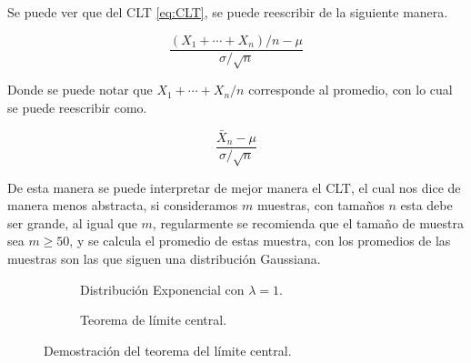 Se puede ver que del CLT \ref{eq:CLT}, se puede reescribir de la siguiente manera.

\begin{equation*}
	\frac{(X_1+\cdots+X_n)/n - \mu}{\sigma / \sqrt{n}}
\end{equation*}

Donde se puede notar que $X_1+\cdots + X_n/n$ corresponde al promedio, con lo cual se puede reescribir como.

\begin{equation*}
	\frac{\bar{X}_n - \mu}{\sigma / \sqrt{n}}
\end{equation*}

De esta manera se puede interpretar de mejor manera el CLT, el cual nos dice de manera menos abstracta, si consideramos $m$ muestras, con tamaños $n$ esta debe ser grande, al igual que $m$,  regularmente se recomienda que el tamaño de muestra sea $m\geq 50$, y se calcula el promedio de estas muestra, con los promedios de las muestras son las que siguen una distribución Gaussiana.

\begin{figure}[!ht]
    \centering %
    \begin{subfigure}{0.45\textwidth} %
        \centering
        \resizebox{\linewidth}{!}{} %
        \caption{Distribución Exponencial con $\lambda=1$.}
        \label{fig:DisExpo}
    \end{subfigure}
    \hfill
    \begin{subfigure}{0.45\textwidth}
        \centering
        \resizebox{\linewidth}{!}{} %
        \caption{Teorema de límite central.}
        \label{fig:TLC}
    \end{subfigure}
    \caption{Demostración del teorema del límite central.}
    \label{fig:CLT}
\end{figure}